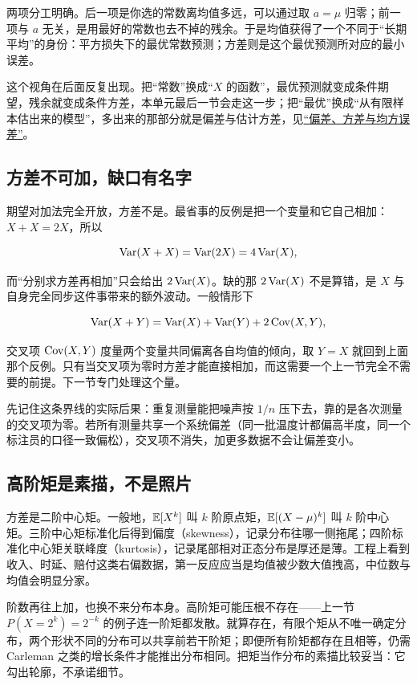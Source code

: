两项分工明确。后一项是你选的常数离均值多远，可以通过取 \(a=\mu\) 归零；前一项与 \(a\) 无关，是用最好的常数也去不掉的残余。于是均值获得了一个不同于``长期平均''的身份：平方损失下的最优常数预测；方差则是这个最优预测所对应的最小误差。

这个视角在后面反复出现。把``常数''换成``\(X\) 的函数''，最优预测就变成条件期望，残余就变成条件方差，本单元最后一节会走这一步；把``最优''换成``从有限样本估出来的模型''，多出来的那部分就是偏差与估计方差，见\hyperref[sec:11-Mathematical-Statistics/02-Point-Estimation/01]{``偏差、方差与均方误差''}。

\subsection{方差不可加，缺口有名字}

期望对加法完全开放，方差不是。最省事的反例是把一个变量和它自己相加：\(X+X=2X\)，所以

\[
\operatorname{Var}(X+X)=\operatorname{Var}(2X)=4\operatorname{Var}(X),
\]

而``分别求方差再相加''只会给出 \(2\operatorname{Var}(X)\)。缺的那 \(2\operatorname{Var}(X)\) 不是算错，是 \(X\) 与自身完全同步这件事带来的额外波动。一般情形下

\[
\operatorname{Var}(X+Y)=\operatorname{Var}(X)+\operatorname{Var}(Y)+2\operatorname{Cov}(X,Y),
\]

交叉项 \(\operatorname{Cov}(X,Y)\) 度量两个变量共同偏离各自均值的倾向，取 \(Y=X\) 就回到上面那个反例。只有当交叉项为零时方差才能直接相加，而这需要一个上一节完全不需要的前提。下一节专门处理这个量。

先记住这条界线的实际后果：重复测量能把噪声按 \(1/n\) 压下去，靠的是各次测量的交叉项为零。若所有测量共享一个系统偏差（同一批温度计都偏高半度，同一个标注员的口径一致偏松），交叉项不消失，加更多数据不会让偏差变小。

\subsection{高阶矩是素描，不是照片}

方差是二阶中心矩。一般地，\(\mathbb{E}[X^k]\) 叫 \(k\) 阶原点矩，\(\mathbb{E}[(X-\mu)^k]\) 叫 \(k\) 阶中心矩。三阶中心矩标准化后得到偏度（skewness），记录分布往哪一侧拖尾；四阶标准化中心矩关联峰度（kurtosis），记录尾部相对正态分布是厚还是薄。工程上看到收入、时延、赔付这类右偏数据，第一反应应当是均值被少数大值拽高，中位数与均值会明显分家。

阶数再往上加，也换不来分布本身。高阶矩可能压根不存在——上一节 \(P(X=2^k)=2^{-k}\) 的例子连一阶矩都发散。就算存在，有限个矩从不唯一确定分布，两个形状不同的分布可以共享前若干阶矩；即便所有阶矩都存在且相等，仍需 Carleman 之类的增长条件才能推出分布相同。把矩当作分布的素描比较妥当：它勾出轮廓，不承诺细节。

